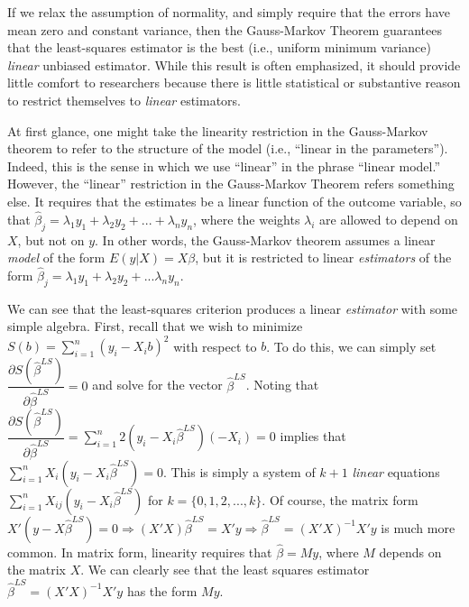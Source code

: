 \documentclass[12pt]{article}
\begin{document}
If we relax the assumption of normality, and simply require that the errors have mean zero and constant variance, then the Gauss-Markov Theorem guarantees that the least-squares estimator is the best (i.e., uniform minimum variance) \textit{linear} unbiased estimator. 
While this result is often emphasized, it should provide little comfort to researchers because there is little statistical or substantive reason to restrict themselves to \textit{linear} estimators.

At first glance, one might take the linearity restriction in the Gauss-Markov theorem to refer to the structure of the model (i.e., ``linear in the parameters''). 
Indeed, this is the sense in which we use ``linear'' in the phrase ``linear model.'' 
However, the ``linear'' restriction in the Gauss-Markov Theorem refers something else. 
It requires that the estimates be a linear function of the outcome variable, so that $\hat{\beta}_j = \lambda_1 y_1 + \lambda_2 y_2 + ... + \lambda_n y_n$, where the weights $\lambda_i$ are allowed to depend on $X$, but not on $y$.%
In other words, the Gauss-Markov theorem assumes a linear \textit{model} of the form $E(y | X) = X\beta$, but it is restricted to linear \textit{estimators} of the form $\hat{\beta}_j = \lambda_1 y_1 + \lambda_2 y_2 + ... \lambda_n y_n$. 

We can see that the least-squares criterion produces a linear \textit{estimator} with some simple algebra. 
First, recall that we wish to minimize $S(b) = \sum_{i = 1}^n(y_i - X_ib)^2$ with respect to $b$. 
To do this, we can simply set $\dfrac{\partial S(\hat{\beta}^{LS})}{\partial \hat{\beta}^{LS}} = 0$ and solve for the vector $\hat{\beta}^{LS}$. 
Noting that $\dfrac{\partial S(\hat{\beta}^{LS})}{\partial \hat{\beta}^{LS}} = \sum_{i = 1}^n 2(y_i - X_i\hat{\beta}^{LS})(-X_i) = 0$ implies that $\sum_{i = 1}^n X_i(y_i - X_i\hat{\beta}^{LS}) = 0$. 
This is simply a system of $k+1$ \textit{linear} equations $\sum_{i = 1}^n X_{ij}(y_i - X_i\hat{\beta}^{LS})$ for $k = \{0, 1, 2,..., k\}$. 
Of course, the matrix form $X'(y - X\hat{\beta}^{LS}) = 0 \Rightarrow (X'X)\hat{\beta}^{LS} = X'y \Rightarrow \hat{\beta}^{LS} = (X'X)^{-1}X'y$ is much more common. 
In matrix form, linearity requires that $\hat{\beta} = My$, where $M$ depends on the matrix $X$. 
We can clearly see that the least squares estimator $\hat{\beta}^{LS} = (X'X)^{-1}X'y$ has the form $My$.
\end{document}
